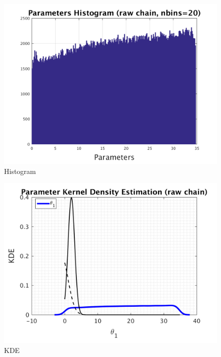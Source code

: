 \begin{figure}[h!]
  
  \centering
   \includegraphics[scale=0.75]{output_20/simple_ip_hist_raw}
   \caption{Histogram}
\end{figure}



\begin{figure}[h!]
  
  \centering
   \includegraphics[scale=0.75]{output_20/simple_ip_kde_raw}
   \caption{ KDE }
\end{figure}

